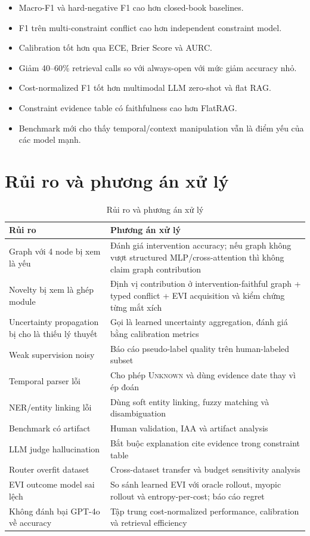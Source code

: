 \documentclass[11pt,a4paper]{article}
\newcommand{\Unk}{\textsc{Unknown}}
\begin{document}
\begin{itemize}[leftmargin=1.5em]
\item Macro-F1 và hard-negative F1 cao hơn closed-book baselines.
\item F1 trên multi-constraint conflict cao hơn independent constraint model.
\item Calibration tốt hơn qua ECE, Brier Score và AURC.
\item Giảm 40--60\% retrieval calls so với always-open với mức giảm accuracy nhỏ.
\item Cost-normalized F1 tốt hơn multimodal LLM zero-shot và flat RAG.
\item Constraint evidence table có faithfulness cao hơn FlatRAG.
\item Benchmark mới cho thấy temporal/context manipulation vẫn là điểm yếu của các model mạnh.
\end{itemize}

\section{Rủi ro và phương án xử lý}

\begin{table}[H]
\centering
\caption{Rủi ro và phương án xử lý}
\begin{tabularx}{\linewidth}{lX}
\toprule
\textbf{Rủi ro} & \textbf{Phương án xử lý}\\
\midrule
Graph với 4 node bị xem là yếu & Đánh giá intervention accuracy; nếu graph không vượt structured MLP/cross-attention thì không claim graph contribution\\
Novelty bị xem là ghép module & Định vị contribution ở intervention-faithful graph + typed conflict + EVI acquisition và kiểm chứng từng mắt xích\\
Uncertainty propagation bị cho là thiếu lý thuyết & Gọi là learned uncertainty aggregation, đánh giá bằng calibration metrics\\
Weak supervision noisy & Báo cáo pseudo-label quality trên human-labeled subset\\
Temporal parser lỗi & Cho phép \Unk{} và dùng evidence date thay vì ép đoán\\
NER/entity linking lỗi & Dùng soft entity linking, fuzzy matching và disambiguation\\
Benchmark có artifact & Human validation, IAA và artifact analysis\\
LLM judge hallucination & Bắt buộc explanation cite evidence trong constraint table\\
Router overfit dataset & Cross-dataset transfer và budget sensitivity analysis\\
EVI outcome model sai lệch & So sánh learned EVI với oracle rollout, myopic rollout và entropy-per-cost; báo cáo regret\\
Không đánh bại GPT-4o về accuracy & Tập trung cost-normalized performance, calibration và retrieval efficiency\\
\bottomrule
\end{tabularx}
\end{table}
\end{document}

